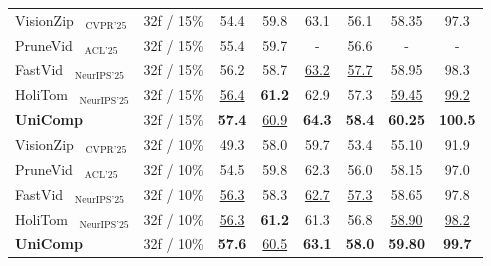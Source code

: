 \documentclass[11pt]{article}
\begin{document}
\begin{table}[htbp]
{\begin{tabular}{lc|cccc|cc}
\midrule
VisionZip~ $_{\text{CVPR'25}}$ & 32f / 15\% & 54.4 & 59.8 & 63.1 & 56.1 & 58.35 & 97.3 \\
PruneVid~ $_{\text{ACL'25}}$& 32f / 15\% & 55.4 & 59.7 & - & 56.6 & - & - \\
FastVid~ $_{\text{NeurIPS'25}}$& 32f / 15\% & 56.2 & 58.7 & \underline{63.2} & \underline{57.7} & 58.95 & 98.3 \\
HoliTom~ $_{\text{NeurIPS'25}}$ & 32f / 15\% & \underline{56.4} & \textbf{61.2} & 62.9 & 57.3 & \underline{59.45} & \underline{99.2} \\
\rowcolor[HTML]{EAFAF1} 
\textbf{UniComp} & 32f / 15\% & \textbf{57.4} & \underline{60.9} & \textbf{64.3} & \textbf{58.4} & \textbf{60.25} & \textbf{100.5} \\
\midrule
VisionZip~ $_{\text{CVPR'25}}$ & 32f / 10\% & 49.3 & 58.0 & 59.7 & 53.4 & 55.10 & 91.9 \\
PruneVid~ $_{\text{ACL'25}}$& 32f / 10\% & 54.5 & 59.8 & 62.3 & 56.0 & 58.15 & 97.0 \\
FastVid~ $_{\text{NeurIPS'25}}$& 32f / 10\% & \underline{56.3} & 58.3 & \underline{62.7} & \underline{57.3} & 58.65 & 97.8 \\
HoliTom~ $_{\text{NeurIPS'25}}$ & 32f / 10\% & \underline{56.3} & \textbf{61.2} & 61.3 & 56.8 & \underline{58.90} & \underline{98.2} \\
\rowcolor[HTML]{EAFAF1} 
\textbf{UniComp} & 32f / 10\% & \textbf{57.6} & \underline{60.5} & \textbf{63.1} & \textbf{58.0} & \textbf{59.80} & \textbf{99.7} \\
\midrule
\bottomrule
\end{tabular}
}
\end{table}
\end{document}
